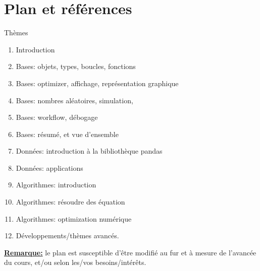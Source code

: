 \documentclass[notes, ignorenonframetext, compress, 10pt, xcolor=svgnames, aspectratio=169]{beamer}
\begin{document}
\section{Plan et références}
\frame{\sectionpage}

\begin{frame}[allowframebreaks]{Thèmes}
\begin{enumerate}
    \item Introduction
    \item Bases: objets, types, boucles, fonctions
    \item Bases: optimizer, affichage, représentation graphique
    \item Bases: nombres aléatoires, simulation,
    \item Bases: workflow, débogage
    \item Bases: résumé, et vue d'ensemble
    \item Données: introduction à la bibliothèque pandas
    \item Données: applications 
    \item Algorithmes: introduction
    \item Algorithmes: résoudre des équation
    \item Algorithmes: optimization numérique
    \item Développements/thèmes avancés.
\end{enumerate}


\underline{\textbf{Remarque:}} le plan est susceptible d'être modifié au fur et à mesure 
de l'avancée du cours, et/ou selon les/vos besoins/intérêts.
\end{frame}
\end{document}
